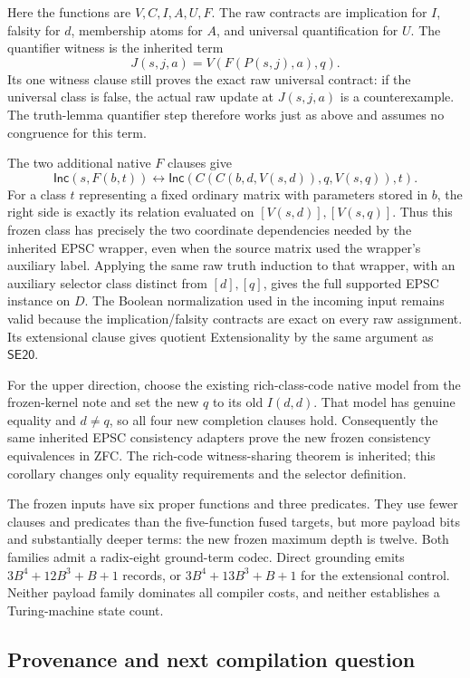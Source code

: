 Here the functions are $V,C,I,A,U,F$. The raw contracts are implication
for $I$, falsity for $d$, membership atoms for $A$, and universal
quantification for $U$. The quantifier witness is the inherited term
\[
 J(s,j,a)=V(F(P(s,j),a),q).
\]
Its one witness clause still proves the exact raw universal contract:
if the universal class is false, the actual raw update at $J(s,j,a)$
is a counterexample. The truth-lemma quantifier step therefore works
just as above and assumes no congruence for this term.

The two additional native $F$ clauses give
\[
 \mathsf{Inc}(s,F(b,t))\leftrightarrow
 \mathsf{Inc}(C(C(b,d,V(s,d)),q,V(s,q)),t).
\]
For a class $t$ representing a fixed ordinary matrix with parameters
stored in $b$, the right side is exactly its relation evaluated on
$[V(s,d)],[V(s,q)]$. Thus this frozen class has precisely the two
coordinate dependencies needed by the inherited EPSC wrapper,
even when the source matrix used the wrapper's auxiliary label.
Applying the same raw truth induction to that wrapper, with an
auxiliary selector class distinct from $[d],[q]$, gives the full
supported EPSC instance on $D$. The Boolean normalization used in
the incoming input remains valid because the implication/falsity
contracts are exact on every raw assignment. Its extensional clause
gives quotient Extensionality by the same argument as $\mathsf{SE20}$.

For the upper direction, choose the existing rich-class-code native
model from the frozen-kernel note and set the new $q$ to its old
$I(d,d)$. That model has genuine equality and $d\ne q$, so all four
new completion clauses hold. Consequently the same inherited
EPSC consistency adapters prove the new frozen consistency
equivalences in ZFC. The rich-code witness-sharing theorem is
inherited; this corollary changes only equality requirements and
the selector definition.

The frozen inputs have six proper functions and three predicates.
They use fewer clauses and predicates than the five-function fused
targets, but more payload bits and substantially deeper terms: the
new frozen maximum depth is twelve. Both families admit a radix-eight
ground-term codec. Direct
grounding emits $3B^4+12B^3+B+1$ records, or $3B^4+13B^3+B+1$
for the extensional control. Neither payload family dominates all
compiler costs, and neither establishes a Turing-machine state count.

\subsection{Provenance and next compilation question}

